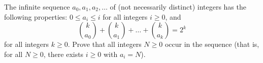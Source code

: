 The infinite sequence $a_0,a _1, a_2, \dots$ of (not necessarily distinct) integers has the following properties: $0\le a_i \le i$ for all integers $i\ge 0$, and \[\binom{k}{a_0} + \binom{k}{a_1} + \dots + \binom{k}{a_k} = 2^k\]for all integers $k\ge 0$. Prove that all integers $N\ge 0$ occur in the sequence (that is, for all $N\ge 0$, there exists $i\ge 0$ with $a_i=N$).